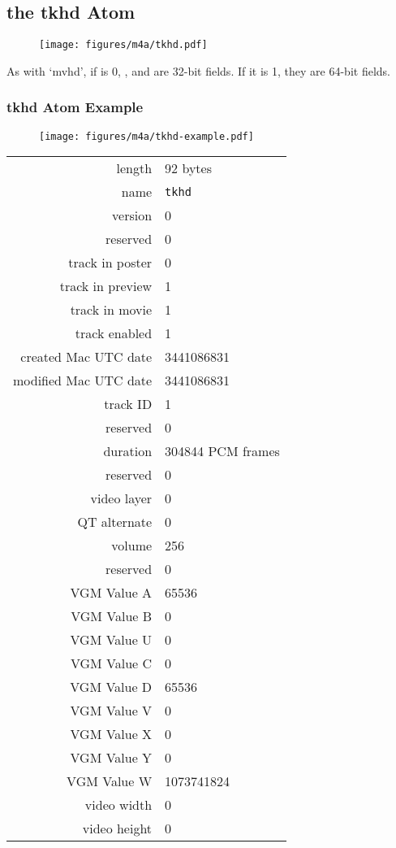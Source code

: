 \subsection{the tkhd Atom}
\begin{figure}[h]
\texttt{[image: figures/m4a/tkhd.pdf]}
\end{figure}
\par
\noindent
As with `mvhd', if  is 0, ,
 and  are 32-bit fields.
If it is 1, they are 64-bit fields.

\clearpage

\subsubsection{tkhd Atom Example}
\begin{figure}[h]
  \texttt{[image: figures/m4a/tkhd-example.pdf]}
\end{figure}
\par
\noindent
\begin{tabular}{rl}
  \textsf{length} & 92 bytes \\
  \textsf{name} & \texttt{tkhd} \\
  \textsf{version} & 0 \\
  \textsf{reserved} & 0 \\
  \textsf{track in poster} & 0 \\
  \textsf{track in preview} & 1 \\
  \textsf{track in movie} & 1 \\
  \textsf{track enabled} & 1 \\
  \textsf{created Mac UTC date} & 3441086831 \\
  \textsf{modified Mac UTC date} & 3441086831 \\
  \textsf{track ID} & 1 \\
  \textsf{reserved} & 0 \\
  \textsf{duration} & 304844 PCM frames \\
  \textsf{reserved} & 0 \\
  \textsf{video layer} & 0 \\
  \textsf{QT alternate} & 0 \\
  \textsf{volume} & 256 \\
  \textsf{reserved} & 0 \\
  \textsf{VGM Value A} & 65536 \\
  \textsf{VGM Value B} & 0 \\
  \textsf{VGM Value U} & 0 \\
  \textsf{VGM Value C} & 0 \\
  \textsf{VGM Value D} & 65536 \\
  \textsf{VGM Value V} & 0 \\
  \textsf{VGM Value X} & 0 \\
  \textsf{VGM Value Y} & 0 \\
  \textsf{VGM Value W} & 1073741824 \\
  \textsf{video width} & 0 \\
  \textsf{video height} & 0 \\
\end{tabular}

